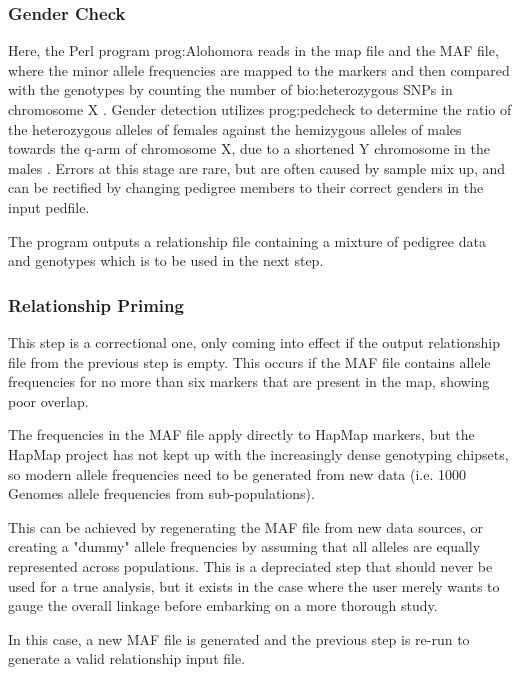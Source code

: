 \subsubsection{Gender Check}

Here, the Perl program \gls{prog:Alohomora} reads in the map file and the MAF file, where the minor allele frequencies are mapped to the markers and then compared with the genotypes by counting the number of \gls{bio:heterozygous} SNPs in chromosome X \cite{ruschendorf2005alohomora}. Gender detection utilizes \gls{prog:pedcheck} to determine the ratio of the heterozygous alleles of females against the hemizygous alleles of males towards the q-arm of chromosome X, due to a shortened Y chromosome in the males \cite{o1998pedcheck}. Errors at this stage are rare, but are often caused by sample mix up, and can be rectified by changing pedigree members to their correct genders in the input pedfile.

The program outputs a relationship file containing a mixture of pedigree data and genotypes which is to be used in the next step.

\subsubsection{Relationship Priming}

This step is a correctional one, only coming into effect if the output relationship file from the previous step is empty. This occurs if the MAF file contains allele frequencies for no more than six markers that are present in the map, showing poor overlap.

The frequencies in the MAF file apply directly to HapMap markers, but the HapMap project has not kept up with the increasingly dense genotyping chipsets, so modern allele frequencies need to be generated from new data (i.e. 1000 Genomes allele frequencies from sub-populations).

\pagebreak
This can be achieved by regenerating the MAF file from new data sources, or creating a "dummy" allele frequencies by assuming that all alleles are equally represented across populations. This is a depreciated step that should never be used for a true analysis, but it exists in the case where the user merely wants to gauge the overall linkage before embarking on a more thorough study.

In this case, a new MAF file is generated and the previous step is re-run to generate a valid relationship input file.


